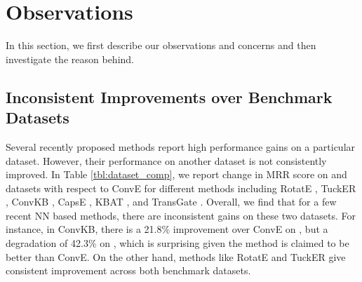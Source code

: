\documentclass[11pt,a4paper]{article}
\begin{document}
%
 


\begin{table}[t]
\centering
	\caption{\label{tbl:dataset_comp}Changes in MRR for different methods on \datafb{} and \datawn{} datasets with respect to ConvE show inconsistent improvements. }
\end{table}
\section{Observations}

In this section, we first describe our observations and concerns and then investigate the reason behind.



\subsection{Inconsistent Improvements over Benchmark Datasets}
\label{sec:results_datasets}
Several recently proposed methods report high performance gains on a particular dataset. However, their performance on another dataset is not consistently improved.
In Table \ref{tbl:dataset_comp}, we report change in MRR score on \datafb{} \cite{toutanova} and \datawn{} \cite{conve} datasets with respect to ConvE \cite{conve} for different methods including RotatE \cite{rotate}, TuckER \cite{tucker}, ConvKB \cite{convkb}, CapsE \cite{capse}, KBAT \cite{kbat}, and TransGate \cite{transgate}. Overall, we find that for a few recent NN based methods, there are inconsistent gains on these two datasets. For instance, in ConvKB, there is a 21.8\% improvement over ConvE on \datafb{}, but a degradation of 42.3\% on \datawn{}, which is surprising given the method is claimed to be better than ConvE. On the other hand, methods like RotatE and TuckER give consistent improvement across both benchmark datasets. 
\end{document}
